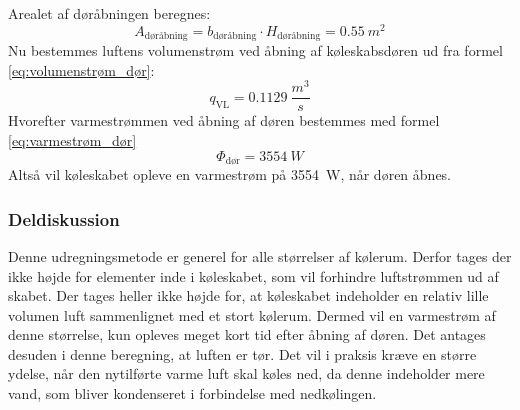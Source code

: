 \documentclass[../Hovedrapport.tex]{subfiles}
\begin{document}
Arealet af døråbningen beregnes:
\begin{equation*}
    A_\text{døråbning} = b_\text{døråbning} \cdot H_\text{døråbning} = \SI{0.55}{m^2}
\end{equation*}
Nu bestemmes luftens volumenstrøm ved åbning af køleskabsdøren ud fra formel \ref{eq:volumenstrøm_dør}:
\begin{equation*}
    q_\text{VL} = \SI{0,1129}{\frac{m^3}{s}}
\end{equation*}
Hvorefter varmestrømmen ved åbning af døren bestemmes med formel \ref{eq:varmestrøm_dør}
\begin{equation*}
    \Phi_\text{dør} = \SI{3554}{W}
\end{equation*}
Altså vil køleskabet opleve en varmestrøm på \SI{3554}{W}, når døren åbnes.
\subsubsection*{Deldiskussion}
Denne udregningsmetode er generel for alle størrelser af kølerum. Derfor tages der ikke højde for elementer inde i køleskabet, som vil forhindre luftstrømmen ud af skabet. Der tages heller ikke højde for, at køleskabet indeholder en relativ lille volumen luft sammenlignet med et stort kølerum. Dermed vil en varmestrøm af denne størrelse, kun opleves meget kort tid efter åbning af døren. Det antages desuden i denne beregning, at luften er tør. Det vil i praksis kræve en større ydelse, når den nytilførte varme luft skal køles ned, da denne indeholder mere vand, som bliver kondenseret i forbindelse med nedkølingen.
\end{document}
